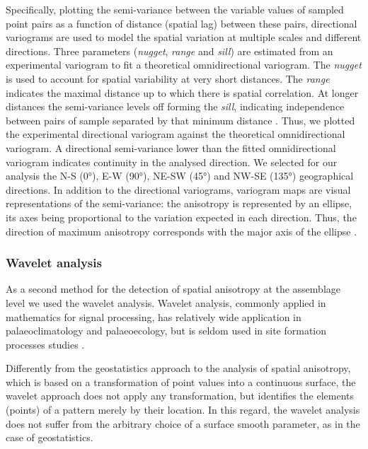 \documentclass[review,times,authoryear]{elsarticle} %
\begin{document}
Specifically, plotting the semi-variance between the variable values of sampled point pairs as a function of distance (spatial lag) between these pairs, directional variograms are used to model the spatial variation at multiple scales and different directions. Three parameters (\emph{nugget}, \emph{range} and \emph{sill}) are estimated from an experimental variogram to fit a theoretical omnidirectional variogram. The \emph{nugget} is used to account for spatial variability at very short distances. The \emph{range} indicates the maximal distance up to which there is spatial correlation. At longer distances the semi-variance levels off forming the \emph{sill}, indicating independence between pairs of sample separated by that minimum distance \citep{Dale2014,Lloyd2004}. Thus, we plotted the experimental directional variogram against the theoretical omnidirectional variogram. A directional semi-variance lower than the fitted omnidirectional variogram indicates continuity in the analysed direction. We selected for our analysis the N-S (0°), E-W (90°), NE-SW (45°) and NW-SE (135°) geographical directions. In addition to the directional variograms, variogram maps are visual representations of the semi-variance: the anisotropy is represented by an ellipse, its axes being proportional to the variation expected in each direction. Thus, the direction of maximum anisotropy corresponds with the major axis of the ellipse \citep{Legendre2012}.

\subsubsection{Wavelet analysis}

As a second method for the detection of spatial anisotropy at the assemblage level we used the wavelet analysis. Wavelet analysis, commonly applied in mathematics for signal processing, has relatively wide application in palaeoclimatology and palaeoecology, but is seldom used in site formation processes studies \citep{Markofsky2012}.

Differently from the geostatistics approach to the analysis of spatial anisotropy, which is based on a transformation of point values into a continuous surface, the wavelet approach does not apply any transformation, but identifies the elements (points) of a pattern merely by their location. In this regard, the wavelet analysis does not suffer from the arbitrary choice of a surface smooth parameter, as in the case of geostatistics.
\end{document}
